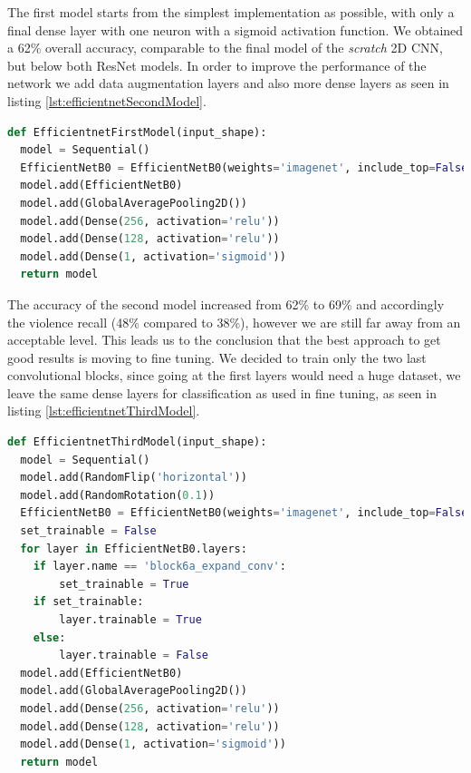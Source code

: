 The first model starts from the simplest implementation as possible, with only a final dense layer with one neuron with a sigmoid activation function.
We obtained a 62\% overall accuracy, comparable to the final model of the \emph{scratch} 2D CNN, but below both ResNet models. In order to improve the performance of the network we add data augmentation layers and also more dense layers as seen in listing \ref{lst:efficientnetSecondModel}.

\begin{lstlisting}[language=python, caption={EfficientNetB0 second model}, label={lst:efficientnetSecondModel}]
def EfficientnetFirstModel(input_shape):
  model = Sequential()
  EfficientNetB0 = EfficientNetB0(weights='imagenet', include_top=False, input_shape=input_shape)
  model.add(EfficientNetB0)
  model.add(GlobalAveragePooling2D())
  model.add(Dense(256, activation='relu'))
  model.add(Dense(128, activation='relu'))
  model.add(Dense(1, activation='sigmoid'))
  return model
\end{lstlisting}

The accuracy of the second model increased from 62\% to 69\% and accordingly the violence recall (48\% compared to 38\%), however we are still far away from an acceptable level. This leads us to the conclusion that the best approach to get good results is moving to fine tuning. 
We decided to train only the two last convolutional blocks, since going at the first layers would need a huge dataset, we leave the same dense layers for classification as used in fine tuning, as seen in listing \ref{lst:efficientnetThirdModel}. 

\begin{lstlisting}[language=python, caption={EfficientNetB0 third model}, label={lst:efficientnetThirdModel}]
def EfficientnetThirdModel(input_shape):
  model = Sequential()
  model.add(RandomFlip('horizontal'))
  model.add(RandomRotation(0.1))
  EfficientNetB0 = EfficientNetB0(weights='imagenet', include_top=False, input_shape=input_shape)
  set_trainable = False
  for layer in EfficientNetB0.layers:
    if layer.name == 'block6a_expand_conv':
        set_trainable = True
    if set_trainable:
        layer.trainable = True
    else:
        layer.trainable = False
  model.add(EfficientNetB0)
  model.add(GlobalAveragePooling2D())
  model.add(Dense(256, activation='relu'))
  model.add(Dense(128, activation='relu'))
  model.add(Dense(1, activation='sigmoid'))
  return model
\end{lstlisting}

